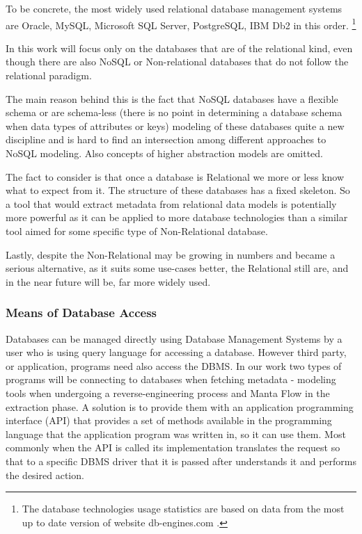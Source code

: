 To be concrete, the most widely used relational database management systems are Oracle, MySQL, Microsoft SQL Server, PostgreSQL, IBM Db2 in this order. \footnote{The database technologies usage statistics are based on data from the most up to date version of website db-engines.com \cite{DatabaseEnginesStatistics19}.}

In this work will focus only on the databases that are of the relational kind, even though there are also NoSQL or Non-relational databases that do not follow the relational paradigm. 

The main reason behind this is the fact that NoSQL databases have a flexible schema or are schema-less (there is no point in determining a database schema when data types of attributes or keys) modeling of these databases quite a new discipline and is hard to find an intersection among different approaches to NoSQL modeling.
Also concepts of higher abstraction models are omitted. \cite{NoSQLDatabaseModeling}

The fact to consider is that once a database is Relational we more or less know what to expect from it. The structure of these databases has a fixed skeleton. So a tool that would extract metadata from relational data models is potentially more powerful as it can be applied to more database technologies than a similar tool aimed for some specific type of Non-Relational database. 

Lastly, despite the Non-Relational may be growing in numbers and became a serious alternative, as it suits some use-cases better, the Relational still are, and in the near future will be, far more widely used.

\subsubsection{Means of Database Access}

Databases can be managed directly using Database Management Systems by a user who is using query language for accessing a database. 
However third party, or application, programs need also access the DBMS. 
In our work two types of programs will be connecting to databases when fetching metadata - modeling tools when undergoing a reverse-engineering process and Manta Flow in the extraction phase.
A solution is to provide them with an application programming interface (API) that provides a set of methods available in the programming language that the application program was written in, so it can use them.
Most commonly when the API is called its implementation translates the request so that to a specific DBMS driver that it is passed after understands it and performs the desired action. \\

